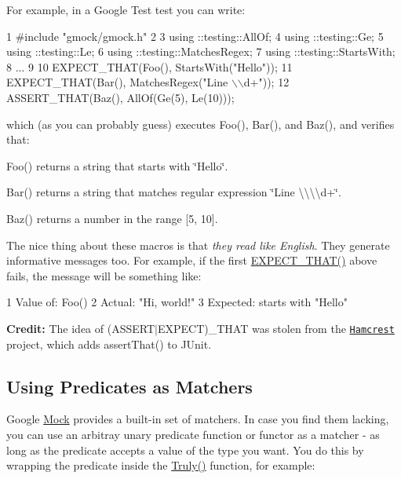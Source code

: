 For example, in a Google Test test you can write\+:


\begin{DoxyCode}
1 #include "gmock/gmock.h"
2 
3 using ::testing::AllOf;
4 using ::testing::Ge;
5 using ::testing::Le;
6 using ::testing::MatchesRegex;
7 using ::testing::StartsWith;
8 ...
9 
10   EXPECT\_THAT(Foo(), StartsWith("Hello"));
11   EXPECT\_THAT(Bar(), MatchesRegex("Line \(\backslash\)\(\backslash\)d+"));
12   ASSERT\_THAT(Baz(), AllOf(Ge(5), Le(10)));
\end{DoxyCode}


which (as you can probably guess) executes {\ttfamily Foo()}, {\ttfamily Bar()}, and {\ttfamily Baz()}, and verifies that\+:


\begin{DoxyItemize}
\item {\ttfamily Foo()} returns a string that starts with {\ttfamily \char`\"{}\+Hello\char`\"{}}.
\item {\ttfamily Bar()} returns a string that matches regular expression {\ttfamily \char`\"{}\+Line \textbackslash{}\textbackslash{}\textbackslash{}\textbackslash{}d+\char`\"{}}.
\item {\ttfamily Baz()} returns a number in the range \mbox{[}5, 10\mbox{]}.
\end{DoxyItemize}

The nice thing about these macros is that {\itshape they read like English}. They generate informative messages too. For example, if the first {\ttfamily \hyperlink{gmock-matchers_8h_ac31e206123aa702e1152bb2735b31409}{E\+X\+P\+E\+C\+T\+\_\+\+T\+H\+A\+T()}} above fails, the message will be something like\+:


\begin{DoxyCode}
1 Value of: Foo()
2   Actual: "Hi, world!"
3 Expected: starts with "Hello"
\end{DoxyCode}


{\bfseries Credit\+:} The idea of {\ttfamily (A\+S\+S\+E\+R\+T$\vert$\+E\+X\+P\+E\+CT)\+\_\+\+T\+H\+AT} was stolen from the \href{http://code.google.com/p/hamcrest/}{\tt Hamcrest} project, which adds {\ttfamily assert\+That()} to J\+Unit.

\subsection*{Using Predicates as Matchers}

Google \hyperlink{class_mock}{Mock} provides a built-\/in set of matchers. In case you find them lacking, you can use an arbitray unary predicate function or functor as a matcher -\/ as long as the predicate accepts a value of the type you want. You do this by wrapping the predicate inside the {\ttfamily \hyperlink{namespacetesting_a5faf05cfaae6074439960048e478b1c8}{Truly()}} function, for example\+:


